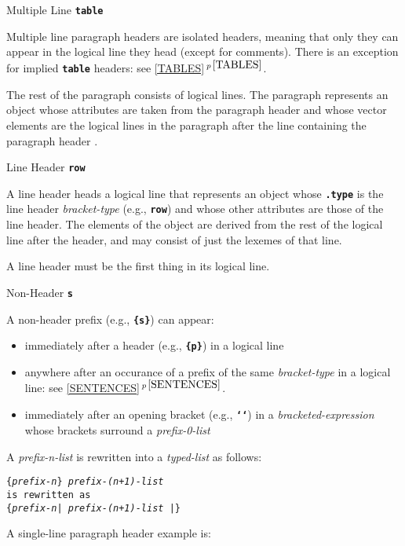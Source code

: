 \documentclass[12pt]{article}
\newcommand{\TT}[1]{{\tt \bfseries #1}}
\newcommand{\itemref}[1]{\ref{#1}$\,^{p\,\pageref{#1}}$}
\newenvironment{indpar}[1][0.3in]%
	{\begin{list}{}%
		     {\setlength{\itemsep}{0in}%
		      \setlength{\topsep}{0in}%
		      \setlength{\parsep}{1ex}%
		      \setlength{\labelwidth}{#1}%
		      \setlength{\leftmargin}{#1}%
		      \addtolength{\leftmargin}{\labelsep}}%
	 \item}%
	{\end{list}}
\begin{document}
\begin{indpar}[1em]
\begin{indpar}[1em]
Multiple Line \hfill \TT{table}
\begin{indpar}[1em]
Multiple line paragraph headers
are isolated headers, meaning that only they can appear in the
logical line they head (except for comments).
There is an exception for implied \TT{table} headers: see \itemref{TABLES}.

The rest of the paragraph consists of logical lines.  The paragraph
represents an object whose attributes are taken from the paragraph header
and whose vector elements are the logical lines in the paragraph after
the line containing the paragraph header .
\end{indpar}
\end{indpar}
Line Header \hfill \TT{row}
\begin{indpar}[1em]
A line header heads a logical line that represents an object
whose \TT{.type} is the line header {\em bracket-type} (e.g., \TT{row})
and whose other attributes are those of the line header.
The elements of the object are derived from the rest of the
logical line after the header, and may consist of just the
lexemes of that line.

A line header must be the first thing in its logical line.
\end{indpar}
Non-Header \hfill \TT{s}
\begin{indpar}[1em]
A non-header prefix (e.g., \TT{\{s\}}) can appear:
\raggedright
\begin{itemize}
\item immediately after a header (e.g., \TT{\{p\}}) in a logical line
\item anywhere after an occurance of a prefix of the same {\em bracket-type}
in a logical line: see \itemref{SENTENCES}.
\item immediately after an opening bracket (e.g., \TT{`{}`})
in a {\em bracketed-expression} whose brackets surround a {\em prefix-0-list}
\end{itemize}
\end{indpar}
\end{indpar}

A {\em prefix-n-list} is rewritten into a {\em typed-list} as follows:
\begin{center}
\tt \{{\em prefix-n}\} {\em prefix-(n+1)-list} \\
is rewritten as \\
\tt \{{\em prefix-n}| {\em prefix-(n+1)-list} |\}
\end{center}

A single-line paragraph header example is:
\end{document}
